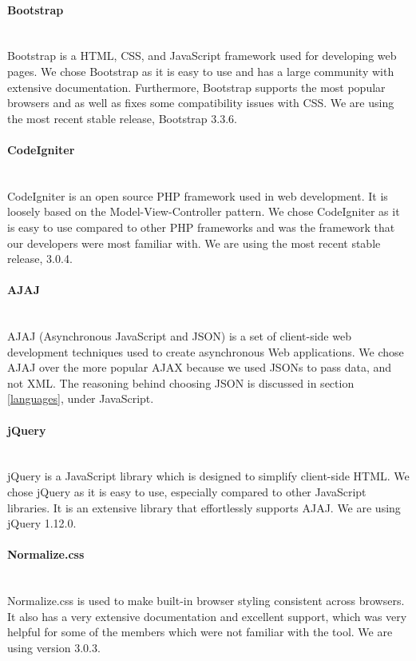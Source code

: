 \documentclass[12pt]{article}
\begin{document}
\paragraph*{Bootstrap}~\\
Bootstrap is a HTML, CSS, and JavaScript framework used for developing web pages. We chose Bootstrap as it is easy to use and has a large community with extensive documentation. Furthermore, Bootstrap supports the most popular browsers and as well as fixes some compatibility issues with CSS. We are using the most recent stable release, Bootstrap 3.3.6.
%
\paragraph*{CodeIgniter}~\\
CodeIgniter is an open source PHP framework used in web development. It is loosely based on the Model-View-Controller pattern. We chose CodeIgniter as it is easy to use compared to other PHP frameworks and was the framework that our developers were most familiar with. We are using the most recent stable release, 3.0.4.
%
\paragraph*{AJAJ}~\\
AJAJ (Asynchronous JavaScript and JSON) is a set of client-side web development techniques used to create asynchronous Web applications. We chose AJAJ over the more popular AJAX because we used JSONs to pass data, and not XML. The reasoning behind choosing JSON is discussed in section \ref{languages}, under JavaScript.
%
\paragraph*{jQuery}~\\
jQuery is a JavaScript library which is designed to simplify client-side HTML. We chose jQuery as it is easy to use, especially compared to other JavaScript libraries. It is an extensive library that effortlessly supports AJAJ. We are using jQuery 1.12.0.
%
\paragraph*{Normalize.css}~\\
Normalize.css is used to make built-in browser styling consistent across browsers. It also has a very extensive documentation and excellent support, which was very helpful for some of the members which were not familiar with the tool. We are using version 3.0.3.
%
\end{document}
